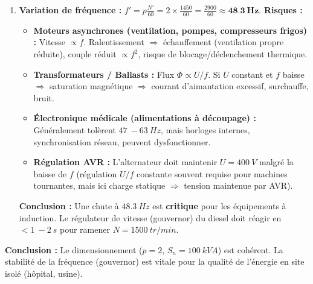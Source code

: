 \documentclass[11pt]{article}
\begin{document}
\begin{exoresolu}
\begin{enumerate}
    \item \textbf{Variation de fréquence :}
    $f' = p \frac{N'}{60} = 2 \times \frac{1450}{60} = \frac{2900}{60} \approx \mathbf{\SI{48,3}{Hz}}$.
    \textbf{Risques :}
    \begin{itemize}
        \item \textbf{Moteurs asynchrones (ventilation, pompes, compresseurs frigos) :} Vitesse $\propto f$. Ralentissement $\Rightarrow$ échauffement (ventilation propre réduite), couple réduit $\propto f^2$, risque de blocage/déclenchement thermique.
        \item \textbf{Transformateurs / Ballasts :} Flux $\Phi \propto U/f$. Si $U$ constant et $f$ baisse $\Rightarrow$ saturation magnétique $\Rightarrow$ courant d'aimantation excessif, surchauffe, bruit.
        \item \textbf{Électronique médicale (alimentations à découpage) :} Généralement tolèrent $\SI{47}{-}\SI{63}{Hz}$, mais horloges internes, synchronisation réseau, peuvent dysfonctionner.
        \item \textbf{Régulation AVR :} L'alternateur doit maintenir $U=\SI{400}{V}$ malgré la baisse de $f$ (régulation $U/f$ constante souvent requise pour machines tournantes, mais ici charge statique $\Rightarrow$ tension maintenue par AVR).
    \end{itemize}
    \textbf{Conclusion :} Une chute à $\SI{48,3}{Hz}$ est \textbf{critique} pour les équipements à induction. Le régulateur de vitesse (gouvernor) du diesel doit réagir en $< \SI{1}{-}\SI{2}{s}$ pour ramener $N=\SI{1500}{tr/min}$.
\end{enumerate}
\par\medskip\noindent\textbf{Conclusion :} Le dimensionnement ($p=2$, $S_n=\SI{100}{kVA}$) est cohérent. La stabilité de la fréquence (gouvernor) est vitale pour la qualité de l'énergie en site isolé (hôpital, usine).
\end{exoresolu}
\end{document}
